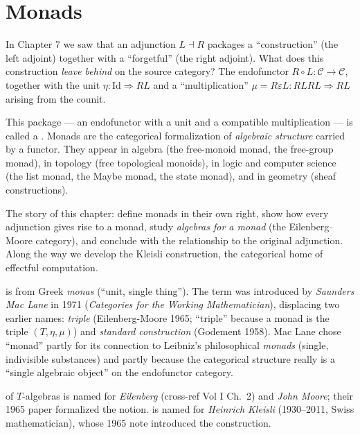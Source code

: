\chapter{Monads}

\begin{overviewbox}
In Chapter 7 we saw that an adjunction $L \dashv R$ packages a
``construction'' (the left adjoint) together with a ``forgetful''
(the right adjoint). What does this construction \emph{leave behind} on
the source category? The endofunctor $R \circ L : \mathcal{C} \to
\mathcal{C}$, together with the unit $\eta : \mathrm{Id} \Rightarrow R L$
and a ``multiplication'' $\mu = R \varepsilon L : R L R L \Rightarrow R L$
arising from the counit.

This package --- an endofunctor with a unit and a compatible
multiplication --- is called a . Monads are the categorical
formalization of \emph{algebraic structure} carried by a functor. They
appear in algebra (the free-monoid monad, the free-group monad), in
topology (free topological monoids), in logic and computer science (the
list monad, the Maybe monad, the state monad), and in geometry (sheaf
constructions).

The story of this chapter: define monads in their own right, show how
every adjunction gives rise to a monad, study \emph{algebras for a monad}
(the Eilenberg--Moore category), and conclude with the relationship to
the original adjunction. Along the way we develop the Kleisli
construction, the categorical home of effectful computation.
\end{overviewbox}


\begin{nameorigin}
 is from Greek \emph{monas} (``unit, single thing''). The
term was introduced by \emph{Saunders Mac Lane} in 1971 (\emph{Categories
for the Working Mathematician}), displacing two earlier names:
\emph{triple} (Eilenberg-Moore 1965; ``triple'' because a monad is the
triple $(T, \eta, \mu)$) and \emph{standard construction} (Godement
1958). Mac Lane chose ``monad'' partly for its connection to Leibniz's
philosophical \emph{monads} (single, indivisible substances) and partly
because the categorical structure really is a ``single algebraic object''
on the endofunctor category.

 of $T$-algebras is named for
\emph{Eilenberg} (cross-ref Vol I Ch.~2) and \emph{John Moore}; their
1965 paper formalized the notion.  is named for
\emph{Heinrich Kleisli} (1930--2011, Swiss mathematician), whose 1965
note introduced the construction.
\end{nameorigin}

